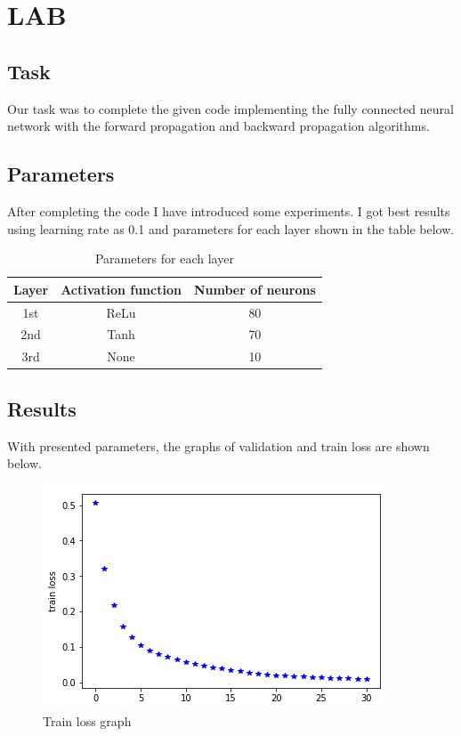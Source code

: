 \documentclass{scrartcl}
\begin{document}
\section*{LAB}
\subsection*{Task}
Our task was to complete the given code implementing the fully connected neural network with the forward propagation and backward propagation algorithms. 

\subsection*{Parameters}
After completing the code I have introduced some experiments. I got best results using learning rate as 0.1 and parameters for each layer shown in the table below. 


\begin{table}[h]
	\centering
\begin{tabular}{|c||c|c|}
	\hline
	\textbf{Layer} & \textbf{Activation function} & \textbf{Number of neurons} \\ \hline \hline
	1st & ReLu & 80 \\ \hline
	2nd & Tanh  & 70  \\ \hline
	3rd & None  & 10  \\ \hline
\end{tabular}
\caption{Parameters for each layer}
\end{table}

\subsection*{Results}
With presented parameters, the graphs of validation and train loss are shown below. 
\begin{figure}[H]
	\centering
	\includegraphics[scale=0.6]{train_loss}
	\caption{Train loss graph}
	\label{fig:trainLost}
\end{figure}
\end{document}
